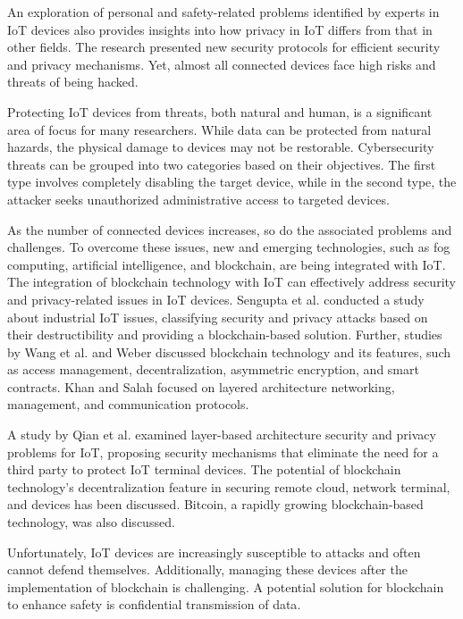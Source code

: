 An exploration of personal and safety-related problems identified by experts in IoT devices also provides insights into how privacy in IoT differs from that in other fields. The research presented new security protocols for efficient security and privacy mechanisms\cite{bamasag2015towards}. Yet, almost all connected devices face high risks and threats of being hacked.


Protecting IoT devices from threats, both natural and human, is a significant area of focus for many researchers. While data can be protected from natural hazards, the physical damage to devices may not be restorable. Cybersecurity threats can be grouped into two categories based on their objectives. The first type involves completely disabling the target device, while in the second type, the attacker seeks unauthorized administrative access to targeted devices.

As the number of connected devices increases, so do the associated problems and challenges. To overcome these issues, new and emerging technologies, such as fog computing, artificial intelligence, and blockchain, are being integrated with IoT. The integration of blockchain technology with IoT can effectively address security and privacy-related issues in IoT devices. Sengupta et al. conducted a study about industrial IoT issues, classifying security and privacy attacks based on their destructibility and providing a blockchain-based solution\cite{sengupta2020comprehensive}. Further, studies by Wang et al. and Weber discussed blockchain technology and its features, such as access management, decentralization, asymmetric encryption, and smart contracts\cite{wang2020blockchain}\cite{weber2010internet}. Khan and Salah focused on layered architecture networking, management, and communication protocols\cite{khan2018iot}.

A study by Qian et al. examined layer-based architecture security and privacy problems for IoT\cite{qian2018towards}, proposing security mechanisms that eliminate the need for a third party to protect IoT terminal devices\cite{sultan2019iot}. The potential of blockchain technology's decentralization feature in securing remote cloud, network terminal, and devices has been discussed\cite{dorri2017blockchain}\cite{naqvi2022ontology}. Bitcoin, a rapidly growing blockchain-based technology, was also discussed\cite{sarwar2021data}\cite{akram2022triple}.

Unfortunately, IoT devices are increasingly susceptible to attacks and often cannot defend themselves\cite{minoli2018blockchain}. Additionally, managing these devices after the implementation of blockchain is challenging\cite{iqbal2021business}. A potential solution for blockchain to enhance safety is confidential transmission of data\cite{sadique2018towards}\cite{shahzad2017privacy}\cite{fan2018blockchain}.
